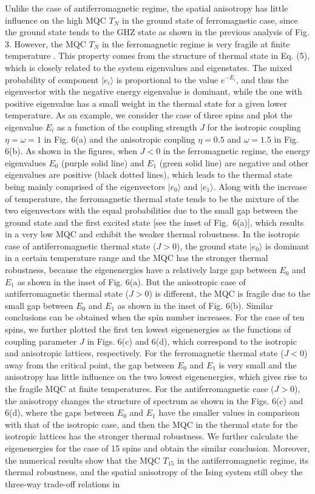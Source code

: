 \documentclass[pra,aps,twocolumn,showpacs]{revtex4}
\newcommand{\ket}[1]{|#1\rangle}
\begin{document}
Unlike the case of antiferromagnetic regime, the spatial anisotropy has little influence on the high MQC $T_N$ in the ground state of ferromagnetic case, since the ground state tends to the GHZ state as shown in the previous analysis of Fig. 3. However, the MQC $T_N$ in the ferromagnetic regime is very fragile at finite temperature \cite{ren21arxiv}. This property comes from the structure of thermal state in Eq. (5), which is closely related to the system eigenvalues and eigenstates. The mixed probability of component $\ket{e_i}$ is proportional to the value $e^{-E_i}$, and thus the eigenvector with the negative energy eigenvalue is dominant, while the one with positive eigenvalue has a small weight in the thermal state for a given lower temperature. As an example, we consider the case of three spins and plot the eigenvalue $E_i$ as a function of the coupling strength $J$ for the isotropic coupling $\eta=\omega=1$ in Fig. 6(a) and the anisotropic coupling $\eta=0.5$ and $\omega=1.5$ in Fig. 6(b). As shown in the figures, when $J<0$ in the ferromagnetic regime, the energy eigenvalues $E_0$ (purple solid line) and $E_1$ (green solid line) are negative and other eigenvalues are positive (black dotted lines), which leads to the thermal state being mainly comprised of the eigenvectors $\ket{e_0}$ and $\ket{e_1}$. Along with the increase of temperature, the ferromagnetic thermal state tends to be the mixture of the two eigenvectors with the equal probabilities due to the small gap between the ground state and the first excited state [see the inset of Fig.~6(a)], which results in a very low MQC and exhibit the weaker thermal robustness. In the isotropic case of antiferromagnetic thermal state ($J>0$), the ground state $\ket{e_0}$ is dominant in a certain temperature range and the MQC has the stronger thermal robustness, because the eigenenergies have a relatively large gap between $E_0$ and $E_1$ as shown in the inset of Fig. 6(a). But the anisotropic case of antiferromagnetic thermal state ($J>0$) is different, the MQC is fragile due to the small gap between $E_0$ and $E_1$ as shown in the inset of Fig. 6(b). Similar conclusions can be obtained when the spin number increases. For the case of ten spins, we further plotted the first ten lowest eigenenergies as the functions of coupling parameter $J$ in Figs. 6(c) and 6(d), which correspond to the isotropic and anisotropic lattices, respectively. For the ferromagnetic thermal state ($J<0$) away from the critical point, the gap between $E_0$ and $E_1$ is very small and the anisotropy has little influence on the two lowest eigenenergies, which gives rise to the fragile MQC at finite temperatures. For the antiferromagnetic case ($J>0$), the anisotropy changes the structure of spectrum as shown in the Figs. 6(c) and 6(d), where the gaps between $E_0$ and $E_1$ have the smaller values in comparison with that of the isotropic case, and then the MQC in the thermal state for the isotropic lattices has the stronger thermal robustness. We further calculate the eigenenergies for the case of 15 spins and obtain the similar conclusion. Moreover, the numerical results show that the MQC $T_{15}$ in the antiferromagnetic regime, its thermal robustness, and the spatial anisotropy of the Ising system still obey the three-way trade-off relations in 
\end{document}
